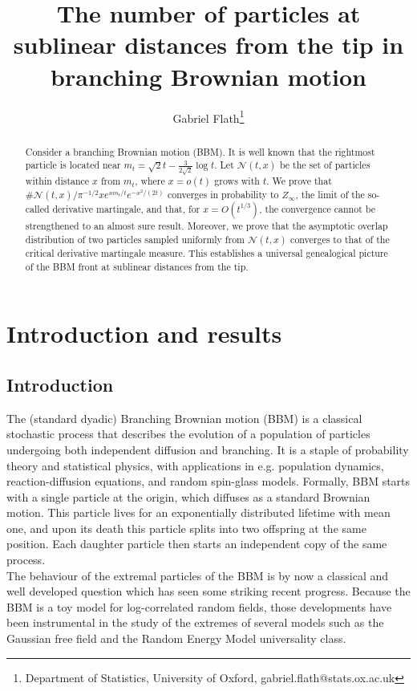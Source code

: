 \documentclass{article}
\title{The number of particles at sublinear distances from the tip in branching Brownian motion}
\author{Gabriel Flath\thanks{Department of Statistics, University of Oxford, gabriel.flath@stats.ox.ac.uk}}
\begin{document}
\maketitle

\begin{abstract}
Consider a branching Brownian motion (BBM). It is well known \cite{Bramson1983ConvergenceOS, Lalley1987ACL} that the rightmost particle is located near \( m_t = \sqrt{2} t - \frac{3}{2\sqrt{2}} \log t \). Let $\mathcal{N}(t,x)$ be the set of particles within distance $x$ from $m_t$, where $x = o(t)$ grows with $t$. We prove that \(\#\mathcal{N}(t,x)/\pi^{-1/2}xe^{xm_t/t} e^{-x^2/(2t)} \) converges in probability to $Z_\infty$, the limit of the so-called derivative martingale, and that, for \( x = O( t^{1/3}) \), the convergence cannot be strengthened to an almost sure result. Moreover, we prove that the asymptotic overlap distribution of two particles sampled uniformly from $\mathcal{N}(t,x)$ converges to that of the critical derivative martingale measure. This establishes a universal genealogical picture of the BBM front at sublinear distances from the tip.
\end{abstract}

\section{Introduction and results}
\subsection{Introduction}

The (standard dyadic) Branching Brownian motion (BBM) is a classical stochastic process that describes the evolution of a population of particles undergoing both independent diffusion and branching. It is a staple of probability theory and statistical physics, with applications in e.g. population dynamics, reaction-diffusion equations, and random spin-glass models. Formally, BBM starts with a single particle at the origin, which diffuses as a standard Brownian motion. This particle lives for an exponentially distributed lifetime with mean one, and upon its death this particle splits into two offspring at the same position. Each daughter particle then starts an independent copy of the same process.
\\

The behaviour of the extremal particles of the BBM is by now a classical and well developed question which has seen some striking recent progress. Because the BBM is a toy model for log-correlated random fields, those developments have been instrumental in the study of the extremes of several models such as the Gaussian free field and the Random Energy Model universality class.\\
\end{document}
